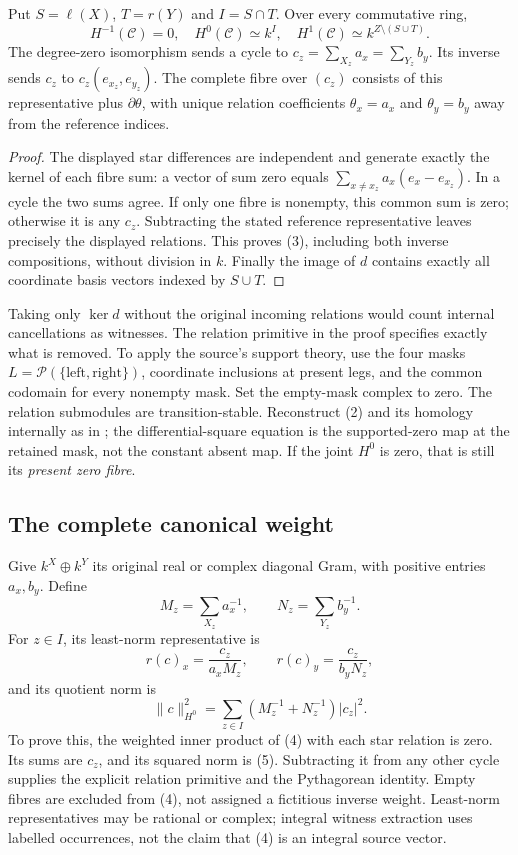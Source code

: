 \begin{theorem}\label{thm:cohom}
Put $S=\ell(X)$, $T=r(Y)$ and $I=S\cap T$. Over every commutative ring,
\[
 H^{-1}(\mathcal C)=0,\quad H^0(\mathcal C)\simeq k^I,
 \quad H^1(\mathcal C)\simeq k^{Z\setminus(S\cup T)}.            \tag{3}
\]
The degree-zero isomorphism sends a cycle to
$c_z=\sum_{X_z}a_x=\sum_{Y_z}b_y$. Its inverse sends $c_z$ to
$c_z(e_{x_z},e_{y_z})$. The complete fibre over $(c_z)$ consists of this
representative plus $\partial\theta$, with unique relation coefficients
$\theta_x=a_x$ and $\theta_y=b_y$ away from the reference indices.
\end{theorem}
\begin{proof}
The displayed star differences are independent and generate exactly the
kernel of each fibre sum: a vector of sum zero equals
$\sum_{x\ne x_z}a_x(e_x-e_{x_z})$. In a cycle the two sums agree. If
only one fibre is nonempty, this common sum is zero; otherwise it is any
$c_z$. Subtracting the stated reference representative leaves precisely
the displayed relations. This proves (3), including both inverse
compositions, without division in $k$. Finally the image of $d$ contains
exactly all coordinate basis vectors indexed by $S\cup T$.
\end{proof}

Taking only $\ker d$ without the original incoming relations would count
internal cancellations as witnesses. The relation primitive in the proof
specifies exactly what is removed. To apply the source's support theory,
use the four masks $L=\mathcal P(\{\mathrm{left},\mathrm{right}\})$,
coordinate inclusions at present legs, and the common codomain for every
nonempty mask. Set the empty-mask complex to zero. The relation submodules
are transition-stable. Reconstruct (2) and its homology internally as in
\cite[\S\S1--4]{Derived}; the differential-square equation is the
supported-zero map at the retained mask, not the constant absent map.
If the joint $H^0$ is zero, that is still its \emph{present zero fibre}.

\subsection{The complete canonical weight}
Give $k^X\oplus k^Y$ its original real or complex diagonal Gram, with
positive entries $a_x,b_y$. Define
\[
 M_z=\sum_{X_z}a_x^{-1},\qquad N_z=\sum_{Y_z}b_y^{-1}.
\]
For $z\in I$, its least-norm representative is
\[
 r(c)_x=\frac{c_z}{a_xM_z},\qquad
 r(c)_y=\frac{c_z}{b_yN_z},                            \tag{4}
\]
and its quotient norm is
\[
 \boxed{\|c\|_{H^0}^2=\sum_{z\in I}
          (M_z^{-1}+N_z^{-1})|c_z|^2.}                \tag{5}
\]
To prove this, the weighted inner product of (4) with each star relation
is zero. Its sums are $c_z$, and its squared norm is (5). Subtracting it
from any other cycle supplies the explicit relation primitive and the
Pythagorean identity. Empty fibres are excluded from (4), not assigned a
fictitious inverse weight. Least-norm representatives may be rational or
complex; integral witness extraction uses labelled occurrences, not the
claim that (4) is an integral source vector.

